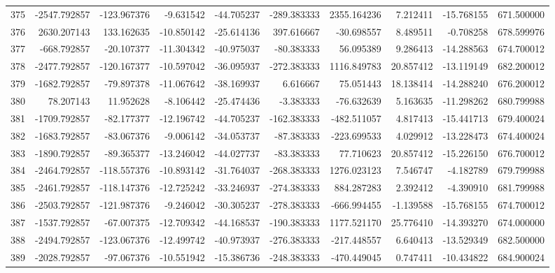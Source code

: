 \begin{tabular}{lrrrrrrrrr}
375 &  -2547.792857 &  -123.967376 &  -9.631542 & -44.705237 &  -289.383333 &  2355.164236 &   7.212411 & -15.768155 &  671.500000 \\
376 &   2630.207143 &   133.162635 & -10.850142 & -25.614136 &   397.616667 &   -30.698557 &   8.489511 &  -0.708258 &  678.599976 \\
377 &   -668.792857 &   -20.107377 & -11.304342 & -40.975037 &   -80.383333 &    56.095389 &   9.286413 & -14.288563 &  674.700012 \\
378 &  -2477.792857 &  -120.167377 & -10.597042 & -36.095937 &  -272.383333 &  1116.849783 &  20.857412 & -13.119149 &  682.200012 \\
379 &  -1682.792857 &   -79.897378 & -11.067642 & -38.169937 &     6.616667 &    75.051443 &  18.138414 & -14.288240 &  676.200012 \\
380 &     78.207143 &    11.952628 &  -8.106442 & -25.474436 &    -3.383333 &   -76.632639 &   5.163635 & -11.298262 &  680.799988 \\
381 &  -1709.792857 &   -82.177377 & -12.196742 & -44.705237 &  -162.383333 &  -482.511057 &   4.817413 & -15.441713 &  679.400024 \\
382 &  -1683.792857 &   -83.067376 &  -9.006142 & -34.053737 &   -87.383333 &  -223.699533 &   4.029912 & -13.228473 &  674.400024 \\
383 &  -1890.792857 &   -89.365377 & -13.246042 & -44.027737 &   -83.383333 &    77.710623 &  20.857412 & -15.226150 &  676.700012 \\
384 &  -2464.792857 &  -118.557376 & -10.893142 & -31.764037 &  -268.383333 &  1276.023123 &   7.546747 &  -4.182789 &  679.799988 \\
385 &  -2461.792857 &  -118.147376 & -12.725242 & -33.246937 &  -274.383333 &   884.287283 &   2.392412 &  -4.390910 &  681.799988 \\
386 &  -2503.792857 &  -121.987376 &  -9.246042 & -30.305237 &  -278.383333 &  -666.994455 &  -1.139588 & -15.768155 &  674.700012 \\
387 &  -1537.792857 &   -67.007375 & -12.709342 & -44.168537 &  -190.383333 &  1177.521170 &  25.776410 & -14.393270 &  674.000000 \\
388 &  -2494.792857 &  -123.067376 & -12.499742 & -40.973937 &  -276.383333 &  -217.448557 &   6.640413 & -13.529349 &  682.500000 \\
389 &  -2028.792857 &   -97.067376 & -10.551942 & -15.386736 &  -248.383333 &  -470.449045 &   0.747411 & -10.434822 &  684.900024 \\

\end{tabular}
